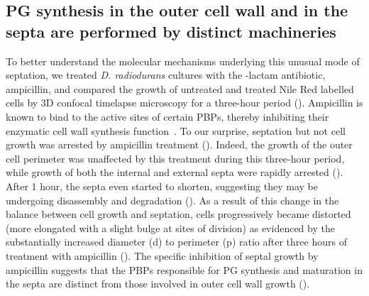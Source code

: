 \FloatBarrier

\subsection[PG synthesis machineries]{PG synthesis in the outer cell wall and in the septa are performed by distinct machineries}

To better understand the molecular mechanisms underlying this unusual mode of septation, we treated \textit{D. radiodurans} cultures with the \beta-lactam antibiotic, ampicillin, and compared the growth of untreated and treated Nile Red labelled cells by 3D confocal timelapse microscopy for a three-hour period ().
Ampicillin is known to bind to the active sites of certain PBPs, thereby inhibiting their enzymatic cell wall synthesis function~\cite{sauvageGlycosyltransferasesTranspeptidasesPenicillinBinding2016}.
To our surprise, septation but not cell growth was arrested by ampicillin treatment ().
Indeed, the growth of the outer cell perimeter was unaffected by this treatment during this three-hour period, while growth of both the internal and external septa were rapidly arrested ().
After 1 hour, the septa even started to shorten, suggesting they may be undergoing disassembly and degradation ().
As a result of this change in the balance between cell growth and septation, cells progressively became distorted (more elongated with a slight bulge at sites of division) as evidenced by the substantially increased diameter (d) to perimeter (p) ratio after three hours of treatment with ampicillin ().
The specific inhibition of septal growth by ampicillin suggests that the PBPs responsible for PG synthesis and maturation in the septa are distinct from those involved in outer cell wall growth ().

